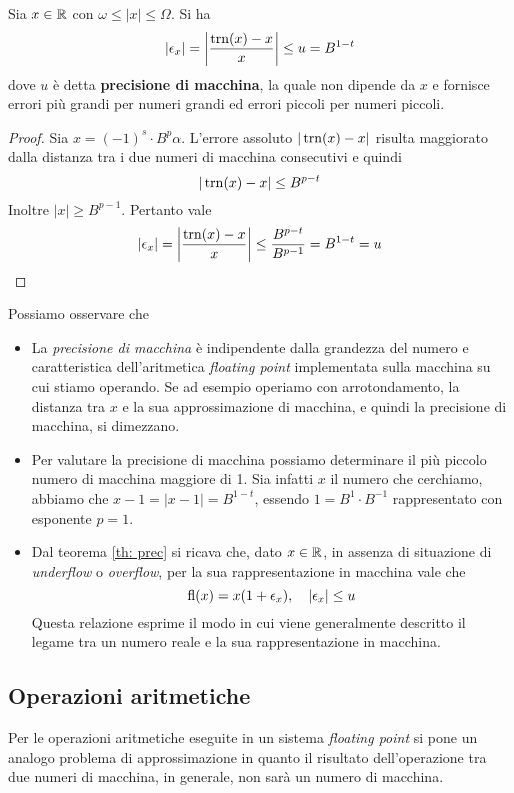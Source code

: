 \begin{theorem}\label{th: prec}
	Sia $x \in \mathbb{R}$ con $\omega \leq |x| \leq \Omega$. Si ha
	\[ |\epsilon_x| = \left| \frac{\operatorname{trn}(x) - x}{x} \right| \leq u = B^{1-t} \]
	dove $u$ è detta \textbf{precisione di macchina}, la quale non dipende da $x$ e fornisce errori più grandi
	per numeri grandi ed errori piccoli per numeri piccoli.
	\begin{proof}
		Sia $x = (-1)^s \cdot B^p \alpha$. L'errore assoluto $|\operatorname{trn}(x) - x|$ risulta maggiorato dalla distanza
		tra i due numeri di macchina consecutivi e quindi
		\[ |\operatorname{trn}(x) - x| \leq B^{p-t} \]
		Inoltre $|x| \geq B^{p-1}$. Pertanto vale
		\[ |\epsilon_x| = \left| \frac{\operatorname{trn}(x) - x}{x} \right| \leq \frac{B^{p-t}}{B^{p-1}} = B^{1-t} = u \]
	\end{proof}
\end{theorem}

\begin{observation}
	Possiamo osservare che
	\begin{itemize}
		\item La \emph{precisione di macchina} è indipendente dalla grandezza del numero e caratteristica
		      dell'aritmetica \emph{floating point} implementata sulla macchina su cui stiamo operando. Se ad
		      esempio operiamo con arrotondamento, la distanza tra $x$ e la sua approssimazione di macchina, e
		      quindi la precisione di macchina, si dimezzano.
		\item Per valutare la precisione di macchina possiamo determinare il più piccolo numero di macchina
		      maggiore di 1. Sia infatti $x$ il numero che cerchiamo, abbiamo che $x - 1 = |x - 1| = B^{1-t}$,
		      essendo $1 = B^1 \cdot B^{-1}$ rappresentato con esponente $p = 1$.
		\item Dal teorema \ref{th: prec} si ricava che, dato $x \in \mathbb{R}$, in assenza di situazione di
		      \emph{underflow} o \emph{overflow}, per la sua rappresentazione in macchina vale che
		      \[ \operatorname{fl}(x) = x (1 + \epsilon_x), \quad |\epsilon_x| \leq u \]
		      Questa relazione esprime il modo in cui viene generalmente descritto il legame tra un numero reale
		      e la sua rappresentazione in macchina.
	\end{itemize}
\end{observation}

\subsection{Operazioni aritmetiche}
Per le operazioni aritmetiche eseguite in un sistema \emph{floating point} si pone un analogo problema di
approssimazione in quanto il risultato dell'operazione tra due numeri di macchina, in generale, non sarà
un numero di macchina.

